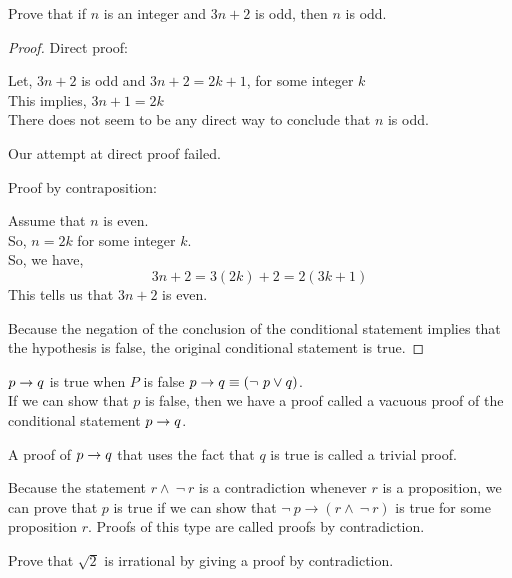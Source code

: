 \documentclass[../main-sheet.tex]{subfiles}
\begin{document}
\begin{prob}
    Prove that if \(n\) is an integer and \(3n+2\) is odd, then \(n\) is odd.
\end{prob}
\begin{proof}
    Direct proof:

    Let, \(3n+2\) is odd and \(3n+2=2k+1\), for some integer \(k\)\\
    This implies, \(3n+1=2k\)\\
    There does not seem to be any direct way to conclude that \(n\) is odd.

    Our attempt at direct proof failed.

    Proof by contraposition:

    Assume that \(n\) is even.\\
    So, \(n=2k\) for some integer \(k\).\\
    So, we have,
    \[3n+2=3(2k)+2=2(3k+1)\]
    This tells us that \(3n+2\) is even.

    Because the negation of the conclusion of the conditional statement implies that the hypothesis is false, the original conditional statement is true.
\end{proof}
\begin{defn}
    \(p \to q\) is true when $ P $ is false \(p \to q\equiv(\neg\ p\vee q)\).\\ If we can show that $ p $ is false, then we have a proof called a vacuous proof of the conditional statement \(p \to q\).
\end{defn}
\begin{defn}
    A proof of \(p \to q\) that uses the fact that $ q $ is true is called a trivial proof.
\end{defn}
\begin{defn}
    Because the statement \(r\wedge\ \neg\ r\) is a contradiction whenever $ r $ is a proposition, we can prove that $ p $ is true if we can show that \(\neg\ p\to(r\wedge\ \neg\ r)\) is true for some proposition $ r $. Proofs of this type are called proofs by contradiction.
\end{defn}
\begin{prob}
    Prove that \(\sqrt{2}\) is irrational by giving a proof by contradiction.
\end{prob}
\end{document}
